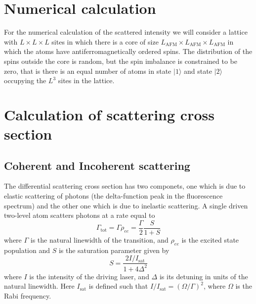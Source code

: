 \documentclass[11pt,letter]{article}
\begin{document}
\section{Numerical calculation}

For the numerical calculation of the scattered intensity we will consider a lattice with $L\times L\times L$ sites in which there is a core of size $L_{\mathrm{AFM}} \times L_{\mathrm{AFM}} \times L_{\mathrm{AFM}}$ in which the atoms have antiferromagnetically ordered spins.   The distribution of the spins outside the core is random, but the spin imbalance is constrained to be zero, that is there is an equal number of atoms in state $|1\rangle$ and state $|2\rangle $  occupying the $L^{3}$ sites in the lattice. 














\section{ Calculation of scattering cross section}

\subsection{Coherent and Incoherent scattering}

The differential scattering cross section has two componets, one which is due
to elastic scattering of photons (the delta-function peak in the fluorescence
spectrum) and the other one which is due to inelastic scattering.  A single driven two-level atom scatters photons at a rate
equal to 
\begin{equation} 
\Gamma_{\mathrm{tot}} = \Gamma \rho_{ee} = \frac{\Gamma}{2} \frac{S}{1+S} 
\end{equation} 
where $\Gamma$ is the natural linewidth of the transition, and  $\rho_{ee}$ is the excited state population and $S$ is the saturation parameter given by 
\begin{equation}
S = \frac{ 2  I/I_{\mathrm{sat}} } { 1 + 4 \Delta^{2} } 
\end{equation}
where $I$ is the intensity of the driving laser, and $\Delta$ is its detuning in units of the natural linewidth.  Here $I_{\mathrm{sat}}$ is defined such that $I/I_{\mathrm{sat}} = (\Omega / \Gamma)^{2}$, where $\Omega$ is the Rabi frequency.  
\end{document}
